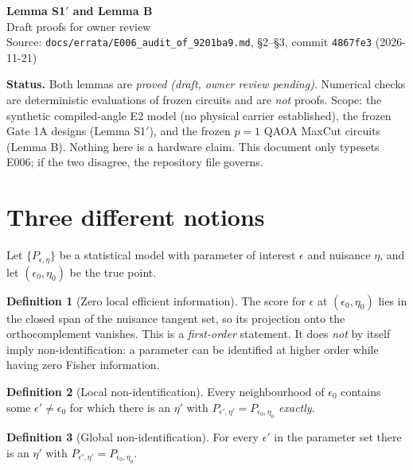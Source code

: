 \documentclass[11pt,a4paper]{article}
\newcommand{\statusbox}[1]{\par\smallskip\noindent\colorbox{boxgray}{\parbox{\dimexpr\linewidth-2\fboxsep}{\small #1}}\par\smallskip}
\theoremstyle{plain}
\theoremstyle{definition}
\newtheorem{definition}{Definition}
\theoremstyle{remark}
\newcommand{\eps}{\epsilon}
\begin{document}
\begin{center}
{\LARGE\bfseries Lemma S1$'$ and Lemma B}\\[4pt]
{\large Draft proofs for owner review}\\[8pt]
{\small Source: \texttt{docs/errata/E006\_audit\_of\_9201ba9.md}, \S2--\S3, commit \texttt{4867fe3} (2026-11-21)}
\end{center}

\statusbox{\textbf{Status.} Both lemmas are \emph{proved (draft, owner review pending)}. Numerical checks are deterministic
evaluations of frozen circuits and are \emph{not} proofs. Scope: the synthetic compiled-angle E2 model
(no physical carrier established), the frozen Gate 1A designs (Lemma S1$'$), and the frozen
$p=1$ QAOA MaxCut circuits (Lemma B). Nothing here is a hardware claim. This document only
typesets E006; if the two disagree, the repository file governs.}

\tableofcontents
\vspace{6pt}

\section{Three different notions}

Let $\{P_{\eps,\eta}\}$ be a statistical model with parameter of interest $\eps$ and nuisance $\eta$,
and let $(\eps_0,\eta_0)$ be the true point.

\begin{definition}[Zero local efficient information]
The score for $\eps$ at $(\eps_0,\eta_0)$ lies in the closed span of the nuisance tangent set,
so its projection onto the orthocomplement vanishes. This is a \emph{first-order} statement.
It does \emph{not} by itself imply non-identification: a parameter can be identified at higher
order while having zero Fisher information.
\end{definition}

\begin{definition}[Local non-identification]
Every neighbourhood of $\eps_0$ contains some $\eps'\neq\eps_0$ for which there is an $\eta'$ with
$P_{\eps',\eta'}=P_{\eps_0,\eta_0}$ \emph{exactly}.
\end{definition}

\begin{definition}[Global non-identification]
For every $\eps'$ in the parameter set there is an $\eta'$ with $P_{\eps',\eta'}=P_{\eps_0,\eta_0}$.
\end{definition}
\end{document}
